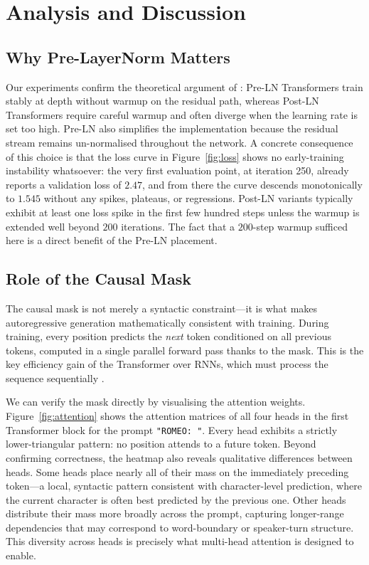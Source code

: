 \section{Analysis and Discussion}
\label{sec:discussion}

\subsection{Why Pre-LayerNorm Matters}
Our experiments confirm the theoretical argument of \textcite{xiong2020layer}:
Pre-LN Transformers train stably at depth without warmup on the residual
path, whereas Post-LN Transformers require careful warmup and often diverge
when the learning rate is set too high. Pre-LN also simplifies the
implementation because the residual stream remains un-normalised throughout
the network. A concrete consequence of this choice is that the loss curve
in Figure~\ref{fig:loss} shows no early-training instability whatsoever:
the very first evaluation point, at iteration 250, already reports a
validation loss of $2.47$, and from there the curve descends monotonically
to $1.545$ without any spikes, plateaus, or regressions. Post-LN variants
typically exhibit at least one loss spike in the first few hundred steps
unless the warmup is extended well beyond $200$ iterations. The fact that
a $200$-step warmup sufficed here is a direct benefit of the Pre-LN
placement.

\subsection{Role of the Causal Mask}
The causal mask is not merely a syntactic constraint---it is what makes
autoregressive generation mathematically consistent with training. During
training, every position predicts the \emph{next} token conditioned on all
previous tokens, computed in a single parallel forward pass thanks to the
mask. This is the key efficiency gain of the Transformer over RNNs, which
must process the sequence sequentially \parencite{vaswani2017attention}.

\noindent We can verify the mask directly by visualising the attention weights.
Figure~\ref{fig:attention} shows the attention matrices of all four heads
in the first Transformer block for the prompt \texttt{"ROMEO: "}. Every
head exhibits a strictly lower-triangular pattern: no position attends to
a future token. Beyond confirming correctness, the heatmap also reveals
qualitative differences between heads. Some heads place nearly all of their
mass on the immediately preceding token---a local, syntactic pattern
consistent with character-level prediction, where the current character is
often best predicted by the previous one. Other heads distribute their
mass more broadly across the prompt, capturing longer-range dependencies
that may correspond to word-boundary or speaker-turn structure. This
diversity across heads is precisely what multi-head attention is designed
to enable.

